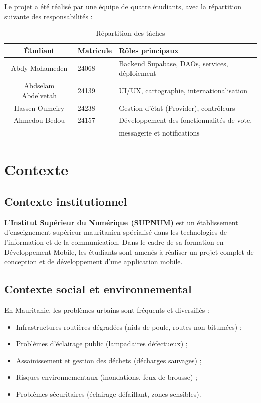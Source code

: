 \documentclass[12pt,a4paper]{report}
\begin{document}
Le projet a été réalisé par une équipe de quatre étudiants, avec la répartition suivante des responsabilités :

\begin{table}[H]
    \centering
    \begin{tabular}{|c|l|l|}
        \hline
        \rowcolor{supnumgreen!20}
        \textbf{Étudiant} & \textbf{Matricule} & \textbf{Rôles principaux} \\
        \hline
        Abdy Mohameden & 24068 & Backend Supabase, DAOs, services, déploiement \\
        \hline
        Abdselam Abdelvetah & 24139 & UI/UX, cartographie, internationalisation \\
        \hline
        Hassen Oumeiry & 24238 & Gestion d'état (Provider), contrôleurs \\
        \hline
        Ahmedou Bedou & 24157 & Développement des fonctionnalités de vote,\\ 
        & & messagerie et notifications \\
        \hline
    \end{tabular}
    \caption{Répartition des tâches}
    \label{tab:team}
\end{table}

\chapter{Contexte}

\section{Contexte institutionnel}

L'\textbf{Institut Supérieur du Numérique (SUPNUM)} est un établissement d'enseignement supérieur mauritanien spécialisé dans les technologies de l'information et de la communication. Dans le cadre de sa formation en Développement Mobile, les étudiants sont amenés à réaliser un projet complet de conception et de développement d'une application mobile.

\section{Contexte social et environnemental}

En Mauritanie, les problèmes urbains sont fréquents et diversifiés :
\begin{itemize}
    \item Infrastructures routières dégradées (nids-de-poule, routes non bitumées) ;
    \item Problèmes d'éclairage public (lampadaires défectueux) ;
    \item Assainissement et gestion des déchets (décharges sauvages) ;
    \item Risques environnementaux (inondations, feux de brousse) ;
    \item Problèmes sécuritaires (éclairage défaillant, zones sensibles).
\end{itemize}
\end{document}
